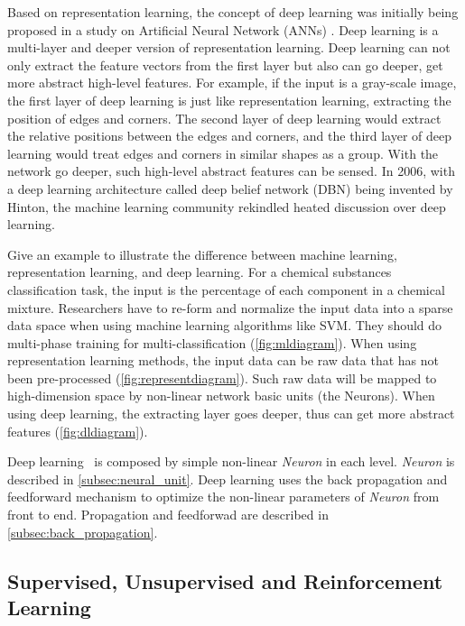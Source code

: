 \begin{spacing}{1.5}
Based on representation learning, the concept of deep learning was initially being proposed in a study on Artificial Neural Network (ANNs) \cite{hinton2006reducing}. Deep learning is a multi-layer and deeper version of representation learning. Deep learning can not only extract the feature vectors from the first layer but also can go deeper, get more abstract high-level features. For example, if the input is a gray-scale image, the first layer of deep learning is just like representation learning, extracting the position of edges and corners. The second layer of deep learning would extract the relative positions between the edges and corners, and the third layer of deep learning would treat edges and corners in similar shapes as a group. With the network go deeper, such high-level abstract features can be sensed. In 2006, with a deep learning architecture called deep belief network (DBN) \cite{hinton2006fast} being invented by Hinton, the machine learning community rekindled heated discussion over deep learning.

Give an example to illustrate the difference between machine learning, representation learning, and deep learning. For a chemical substances classification task, the input is the percentage of each component in a chemical mixture. Researchers have to re-form and normalize the input data into a sparse data space when using machine learning algorithms like SVM. They should do multi-phase training for multi-classification (\autoref{fig:mldiagram}). When using representation learning methods, the input data can be raw data that has not been pre-processed (\autoref{fig:representdiagram}). Such raw data will be mapped to high-dimension space by non-linear network basic units (the Neurons). When using deep learning, the extracting layer goes deeper, thus can get more abstract features (\autoref{fig:dldiagram}).

Deep learning~\cite{lecun2015deep} is composed by simple non-linear \textit{Neuron} in each level. \textit{Neuron} is described in \autoref{subsec:neural_unit}. Deep learning uses the back propagation and feedforward mechanism to optimize the non-linear parameters of \textit{Neuron} from front to end. Propagation and feedforwad are described in \autoref{subsec:back_propagation}.


\subsection{Supervised, Unsupervised and Reinforcement Learning}


\end{spacing}
